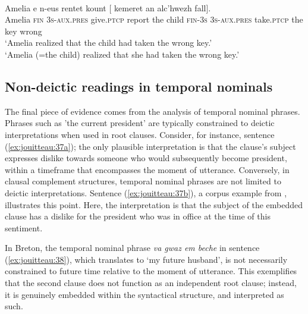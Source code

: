 \documentclass[output=paper,colorlinks,citecolor=brown]{langscibook}
\begin{document}
\ea \label{ex:jouitteau:36} \\
\gll Amelia  e     n-eus rentet kount [  {}    {} kemeret     an  alc’hwezh fall]. \\
Amelia \textsc{fin} \textsc{3s-aux.pres} give\textsc{.ptcp} report {the child} \textsc{fin}{}-\textsc{3s} \textsc{3s-aux.pres}  take\textsc{.ptcp} the  key wrong    \\
\glt ‘Amelia realized that the child had taken the wrong key.’ \\ 
\glt *‘Amelia (=the child) realized that she had taken the wrong key.’ \\
\z 


\subsection{Non-deictic readings in temporal nominals}

The final piece of evidence comes from the analysis of temporal nominal phrases. Phra\-ses such as 'the current president' are typically constrained to deictic interpretations when used in root clauses. Consider, for instance, sentence (\ref{ex:jouitteau:37a}); the only plausible interpretation is that the clause's subject expresses dislike towards someone who would subsequently become president, within a timeframe that encompasses the moment of utterance. Conversely, in clausal complement structures, temporal nominal phrases are not limited to deictic interpretations. Sentence (\ref{ex:jouitteau:37b}), a corpus example from \citet{mj:Norland2020}, illustrates this point. Here, the interpretation is that the subject of the embedded clause has a dislike for the president who was in office at the time of this sentiment. 


In Breton, the temporal nominal phrase \textit{va gwaz em beche} in sentence (\ref{ex:jouitteau:38}), which translates to ‘my future husband’, is not necessarily constrained to future time relative to the moment of utterance. This exemplifies that the second clause does not function as an independent root clause; instead, it is genuinely embedded within the syntactical structure, and interpreted as such. 
\end{document}
